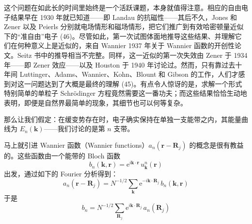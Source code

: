 这个问题在如此长的时间里始终是一个活跃课题，本身就值得注意。相应的自由电子结果早在 1930 年就已知道——即 Landau 的抗磁性——其后不久，Jones 和 Zener 以及 Peierls 分别就电场情形和磁场情形，把它们推广到有效哈密顿量近似下的“准自由”电子 (46)。尽管如此，第一次试图体面地推导这些结果、并理解它们在何种意义上是近似的，来自 Wannier 1937 年关于 Wannier 函数的开创性论文。Seitz 书中的推导相当不完整。同样，这一近似的第一次失效由 Zener 于 1934 年——即 Zener 效应——以及 Houston 于 1940 年讨论过。然而，只有靠过去十年间 Luttinger、Adams、Wannier、Kohn、Blount 和 Gibson 的工作，人们才感到对这一问题达到了大概是最终的理解 (45)。有点令人惊讶的是，求解一个形式特别简单的单粒子 Schrödinger 方程竟然需要这一番功夫；而这些结果恰恰生动地表明，即便是自然界最简单的现象，其细节也可以何等复杂。

那么让我们假定：在缓变势存在时，电子确实保持在单独一支能带之内，其能量曲线为 $E_n(\mathbf{k})$——我们讨论的是第 $n$ 支带。


马上就引进 Wannier 函数（Wannier functions）$a_n(\mathbf{r} - \mathbf{R}_j)$ 的概念是很有教益的。这些函数由一个能带的 Bloch 函数
\begin{equation*}
b_n(\mathbf{k},\mathbf{r}) = \mathrm{e}^{i\mathbf{k}\cdot\mathbf{r}}\, u^n_{\mathbf{k}}(\mathbf{r})
\end{equation*}
出发，通过如下的 Fourier 分析得到：
\begin{equation*}
a_n(\mathbf{r} - \mathbf{R}_j) = N^{-1/2} \sum_{\mathbf{k}} \mathrm{e}^{-i\mathbf{k}\cdot\mathbf{R}_j}\, b_n(\mathbf{k},\mathbf{r}) \tag{19}
\end{equation*}
于是
\begin{equation*}
b_n = N^{-1/2} \sum_{\mathbf{R}_j} \mathrm{e}^{i\mathbf{k}\cdot\mathbf{R}_j}\, a_n(\mathbf{R}_j)
\end{equation*}

